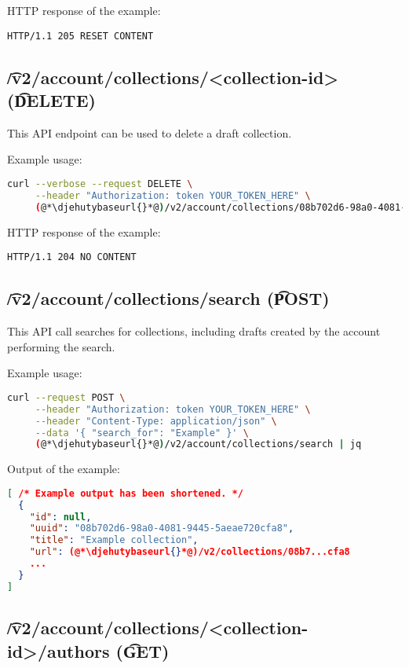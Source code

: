   HTTP response of the example:
\begin{lstlisting}
HTTP/1.1 205 RESET CONTENT
\end{lstlisting}

\subsection{\t{/v2/account/collections/<collection-id>} (\t{DELETE})}

  This API endpoint can be used to delete a draft collection.

  Example usage:
\begin{lstlisting}[language=bash]
curl --verbose --request DELETE \
     --header "Authorization: token YOUR_TOKEN_HERE" \
     (@*\djehutybaseurl{}*@)/v2/account/collections/08b702d6-98a0-4081-9445-5aeae720cfa8
\end{lstlisting}

  HTTP response of the example:
\begin{lstlisting}
HTTP/1.1 204 NO CONTENT
\end{lstlisting}

\subsection{\t{/v2/account/collections/search} (\t{POST})}

  This API call searches for collections, including drafts created
  by the account performing the search.

  \searchParameters

  Example usage:
\begin{lstlisting}[language=bash]
curl --request POST \
     --header "Authorization: token YOUR_TOKEN_HERE" \
     --header "Content-Type: application/json" \
     --data '{ "search_for": "Example" }' \
     (@*\djehutybaseurl{}*@)/v2/account/collections/search | jq
\end{lstlisting}

  Output of the example:
\begin{lstlisting}[language=JSON]
[ /* Example output has been shortened. */
  {
    "id": null,
    "uuid": "08b702d6-98a0-4081-9445-5aeae720cfa8",
    "title": "Example collection",
    "url": (@*\djehutybaseurl{}*@)/v2/collections/08b7...cfa8
    ...
  }
]
\end{lstlisting}

\subsection{\t{/v2/account/collections/<collection-id>/authors} (\t{GET})}
\label{sec:api-v2-collections-authors}

